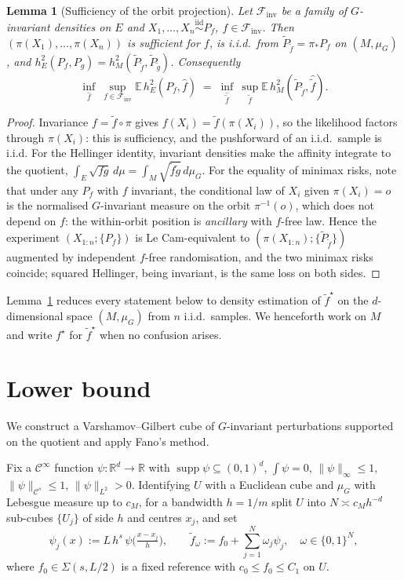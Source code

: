 \documentclass[11pt]{article}
\theoremstyle{plain}
\newtheorem{lemma}[theorem]{Lemma}
\theoremstyle{definition}
\theoremstyle{remark}
\newcommand{\R}{\mathbb{R}}
\newcommand{\E}{\mathbb{E}}
\DeclareMathOperator{\supp}{supp}
\begin{document}
\begin{lemma}[Sufficiency of the orbit projection]\label{lem:suff}
Let $\mathcal F_{\mathrm{inv}}$ be a family of $G$-invariant densities on $E$ and
$X_1,\dots,X_n\stackrel{\text{iid}}{\sim}P_f$, $f\in\mathcal F_{\mathrm{inv}}$.
Then $(\pi(X_1),\dots,\pi(X_n))$ is sufficient for $f$, is i.i.d.\ from
$\tilde P_{\tilde f}=\pi_*P_f$ on $(M,\mu_G)$, and
$h^2_E(P_f,P_g)=h^2_M(\tilde P_{\tilde f},\tilde P_{\tilde g})$. Consequently
\[
\inf_{\widehat f}\ \sup_{f\in\mathcal F_{\mathrm{inv}}}\E\,h^2_E(P_f,\widehat f)
\;=\;
\inf_{\widehat{\tilde f}}\ \sup_{\tilde f}\E\,h^2_M(\tilde P_{\tilde f},\widehat{\tilde f}).
\]
\end{lemma}

\begin{proof}
Invariance $f=\tilde f\circ\pi$ gives $f(X_i)=\tilde f(\pi(X_i))$, so the
likelihood factors through $\pi(X_i)$: this is sufficiency, and the pushforward of
an i.i.d.\ sample is i.i.d. For the Hellinger identity, invariant densities make
the affinity integrate to the quotient,
$\int_E\sqrt{fg}\,d\mu=\int_M\sqrt{\tilde f\tilde g}\,d\mu_G$. For the equality of
minimax risks, note that under any $P_f$ with $f$ invariant, the conditional law of
$X_i$ given $\pi(X_i)=o$ is the normalised $G$-invariant measure on the orbit
$\pi^{-1}(o)$, which does not depend on $f$: the within-orbit position is
\emph{ancillary} with $f$-free law. Hence the experiment $(X_{1:n};\{P_f\})$ is Le
Cam-equivalent to $(\pi(X_{1:n});\{\tilde P_{\tilde f}\})$ augmented by independent
$f$-free randomisation, and the two minimax risks coincide; squared Hellinger,
being invariant, is the same loss on both sides.
\end{proof}

Lemma~\ref{lem:suff} reduces every statement below to density estimation of
$\tilde f^\star$ on the $d$-dimensional space $(M,\mu_G)$ from $n$ i.i.d.\ samples.
We henceforth work on $M$ and write $f^\star$ for $\tilde f^\star$ when no
confusion arises.

\section{Lower bound}\label{sec:lb}

We construct a Varshamov--Gilbert cube of $G$-invariant perturbations supported on
the quotient and apply Fano's method.

Fix a $\mathcal C^\infty$ function $\psi:\R^d\to\R$ with
$\supp\psi\subseteq(0,1)^d$, $\int\psi=0$, $\|\psi\|_\infty\le1$,
$\|\psi\|_{\mathcal C^s}\le1$, $\|\psi\|_{L^2}>0$. Identifying $U$ with a Euclidean
cube and $\mu_G$ with Lebesgue measure up to $c_M$, for a bandwidth $h=1/m$ split
$U$ into $N\asymp c_M h^{-d}$ sub-cubes $\{U_j\}$ of side $h$ and centres $x_j$, and
set
\begin{equation}\label{eq:bumps}
\psi_j(x):=L\,h^s\,\psi\!\Big(\tfrac{x-x_j}{h}\Big),\qquad
\tilde f_\omega:=f_0+\sum_{j=1}^N\omega_j\psi_j,\quad \omega\in\{0,1\}^N,
\end{equation}
where $f_0\in\Sigma(s,L/2)$ is a fixed reference with $c_0\le f_0\le C_1$ on $U$.
\end{document}
